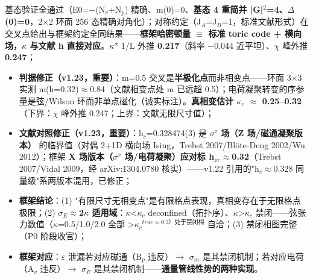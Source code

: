 \documentclass[12pt]{article}
\newcommand{\up}[1]{\ensuremath{^{#1}}}
\newcommand{\down}[1]{\ensuremath{_{#1}}}
\begin{document}
    基态验证全通过（E0=\ensuremath{-}(N\down{v}+N\down{p}) 精确、m(0)=0、\textbf{基态 4 重简并 |G|\up{2}=4、\ensuremath{\Delta}(0)=0}，2\ensuremath{\times}2 环面 256 态精确对角化）；对称约定（J\down{A}=J\down{B}=1，标准文献形式）在交叉点给出与框架约定全同结果------\textbf{框架哈密顿量 \ensuremath{\equiv} 标准 toric code + 横向场，\ensuremath{\kappa} 与文献 h 直接对应}。\ensuremath{\kappa}* 1/L 外推 \textbf{0.217}（斜率 \ensuremath{-}0.044 近平坦）、\ensuremath{\chi} 峰外推 \textbf{0.247}；
\begin{itemize}
\item \textbf{判据修正（v1.23，重要）}：m=0.5 交叉是\textbf{半极化点}而非相变点------环面 3\ensuremath{\times}3 实测 m(h=0.32)\ensuremath{\approx}0.84（文献相变点处 m 已远超 0.5）；电荷凝聚转变的序参量是弦/Wilson 环而非单点磁化（诚实标注）。\textbf{真相变估计 \ensuremath{\kappa}\down{c} \ensuremath{\approx} 0.25--0.32}（下界：\ensuremath{\chi} 峰外推 0.247；上界：文献无限尺寸值）；
\item \textbf{文献对照修正（v1.23，重要）}：h\down{c}=0.328474(3) 是 \textbf{\ensuremath{\sigma}\up{z} 场（Z 场/磁通凝聚版本）} 的临界值（对偶 2+1D 横向场 Ising，Trebst 2007/Bl\"{o}te-Deng 2002/Wu 2012）；框架 \textbf{X 场版本（\ensuremath{\sigma}\up{x} 场/电荷凝聚）应对标 h\down{xc}\ensuremath{\approx}0.32}（Trebst 2007/Vidal 2009，经 arXiv:1304.0780 核实）------v1.22 引用的"h\down{c}\ensuremath{\approx}0.328 同量级"系两版本混用，已修正；
\item \textbf{框架结论}：(1) "有限尺寸无相变点"是有限格点表现，真相变存在于无限格点极限；(2) \textbf{\ensuremath{\sigma}\down{E}\ensuremath{\approx}2\ensuremath{\kappa} 适用域}：\ensuremath{\kappa}<\ensuremath{\kappa}\down{c} deconfined（拓扑序）、\ensuremath{\kappa}>\ensuremath{\kappa}\down{c} 禁闭------弦张力数值（\ensuremath{\kappa}=0.5/1.0/2.0 全部 >\ensuremath{\kappa}\down{c}\up{true\approx{}0.3）处于禁闭相} \checkmark 自洽；(3) 禁闭相图完整（P0 阶段收官）；
\end{itemize}
\begin{itemize}
\item \textbf{框架对应}：\ensuremath{\varepsilon} 泄漏若对应磁通（B\down{p} 违反）\ensuremath{\to} \ensuremath{\sigma}\down{m} 是其禁闭机制；若对应电荷（A\down{v} 违反）\ensuremath{\to} \ensuremath{\sigma}\down{E} 是其禁闭机制------\textbf{通量管线性势的两种实现}。
\end{itemize}
\end{document}
